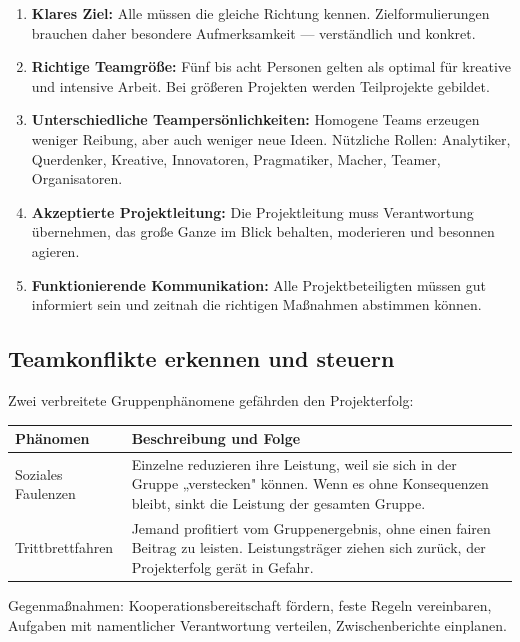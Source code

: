 \documentclass[11pt, a4paper]{article}
\begin{document}
\begin{enumerate}
  \item \textbf{Klares Ziel:} Alle müssen die gleiche Richtung kennen. Zielformulierungen brauchen
        daher besondere Aufmerksamkeit --- verständlich und konkret.
  \item \textbf{Richtige Teamgröße:} Fünf bis acht Personen gelten als optimal für kreative und
        intensive Arbeit. Bei größeren Projekten werden Teilprojekte gebildet.
  \item \textbf{Unterschiedliche Teampersönlichkeiten:} Homogene Teams erzeugen weniger Reibung, aber
        auch weniger neue Ideen. Nützliche Rollen: Analytiker, Querdenker, Kreative, Innovatoren,
        Pragmatiker, Macher, Teamer, Organisatoren.
  \item \textbf{Akzeptierte Projektleitung:} Die Projektleitung muss Verantwortung übernehmen, das
        große Ganze im Blick behalten, moderieren und besonnen agieren.
  \item \textbf{Funktionierende Kommunikation:} Alle Projektbeteiligten müssen gut informiert sein und
        zeitnah die richtigen Maßnahmen abstimmen können.
\end{enumerate}

\subsection{Teamkonflikte erkennen und steuern}

Zwei verbreitete Gruppenphänomene gefährden den Projekterfolg:

\begin{center}
\begin{tabular}{p{4.5cm} p{8cm}}
\toprule
\textbf{Phänomen} & \textbf{Beschreibung und Folge}\\
\midrule
Soziales Faulenzen & Einzelne reduzieren ihre Leistung, weil sie sich in der Gruppe „verstecken"
                     können. Wenn es ohne Konsequenzen bleibt, sinkt die Leistung der gesamten Gruppe.\\
\addlinespace
Trittbrettfahren & Jemand profitiert vom Gruppenergebnis, ohne einen fairen Beitrag zu leisten.
                   Leistungsträger ziehen sich zurück, der Projekterfolg gerät in Gefahr.\\
\bottomrule
\end{tabular}
\end{center}

Gegenmaßnahmen: Kooperationsbereitschaft fördern, feste Regeln vereinbaren, Aufgaben mit
namentlicher Verantwortung verteilen, Zwischenberichte einplanen.
\end{document}
